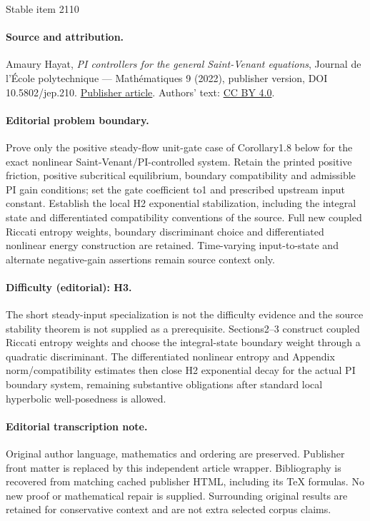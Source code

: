 \documentclass[11pt]{article}
\numberwithin{equation}{section}
\theoremstyle{definition}
\begin{document}
\begin{center}{\Large Stable item 2110}\end{center}
\paragraph{Source and attribution.}
Amaury Hayat, \emph{PI controllers for the general Saint-Venant equations}, Journal de l’École polytechnique — Mathématiques 9 (2022), publisher version, DOI 10.5802/jep.210. \href{https://jep.centre-mersenne.org/articles/10.5802/jep.210/}{Publisher article}. Authors' text: \href{https://creativecommons.org/licenses/by/4.0/}{CC BY 4.0}.
\paragraph{Editorial problem boundary.}
Prove only the positive steady-flow unit-gate case of Corollary1.8 below for the exact nonlinear Saint-Venant/PI-controlled system. Retain the printed positive friction, positive subcritical equilibrium, boundary compatibility and admissible PI gain conditions; set the gate coefficient to1 and prescribed upstream input constant. Establish the local H2 exponential stabilization, including the integral state and differentiated compatibility conventions of the source. Full new coupled Riccati entropy weights, boundary discriminant choice and differentiated nonlinear energy construction are retained. Time-varying input-to-state and alternate negative-gain assertions remain source context only.
\paragraph{Difficulty (editorial): H3.}
The short steady-input specialization is not the difficulty evidence and the source stability theorem is not supplied as a prerequisite. Sections2–3 construct coupled Riccati entropy weights and choose the integral-state boundary weight through a quadratic discriminant. The differentiated nonlinear entropy and Appendix norm/compatibility estimates then close H2 exponential decay for the actual PI boundary system, remaining substantive obligations after standard local hyperbolic well-posedness is allowed.
\paragraph{Editorial transcription note.}
Original author language, mathematics and ordering are preserved. Publisher front matter is replaced by this independent article wrapper. Bibliography is recovered from matching cached publisher HTML, including its TeX formulas. No new proof or mathematical repair is supplied. Surrounding original results are retained for conservative context and are not extra selected corpus claims.
\clearpage
\end{document}
